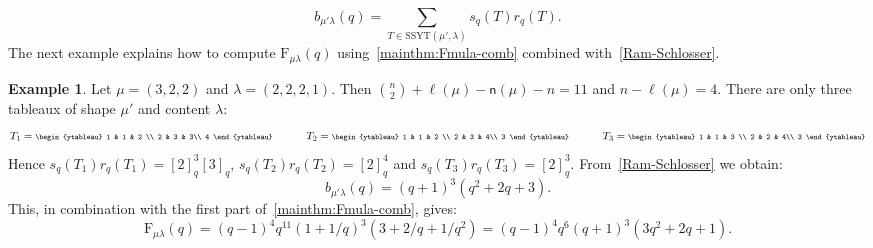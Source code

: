 \documentclass[12pt,a4paper,reqno]{amsart}
\theoremstyle{plain}
\theoremstyle{definition}
\newtheorem{example}[theorem]{Example}
\newcommand{\1}{\mathds{1}}
\newcommand{\F}{\mathrm{F}}
\newcommand{\fn}{\mathsf{n}}
\begin{document}
\begin{equation}\label{Ram-Schlosser} 
b_{\mu'\lambda}(q)=\sum_{T\in \mathrm{SSYT}(\mu',\lambda)}s_q(T)r_q(T). 
\end{equation}
The next example explains how to compute $\F_{\mu\lambda}(q)$ using~\cref{mainthm:Fmula-comb} combined with~\cref{Ram-Schlosser}.
\begin{example}\label{Example:bmu} Let $\mu=(3,2,2)$ and $\lambda=(2,2,2,1)$. Then $\binom{n}{2}+\ell(\mu)-\fn(\mu)-n=11$ and $n-\ell(\mu)=4$. There are only three tableaux of shape $\mu'$ and content $\lambda$:
  \begin{align*}
  \scriptsize
T_1=\begin{ytableau}
 1 & 1 & 2 \\
 2 & 3 & 3\\
 4
\end{ytableau}\qquad\qquad 
T_2=\begin{ytableau}
 1 & 1 & 2 \\
 2 & 3 & 4\\
 3
\end{ytableau}\qquad\qquad
T_3=\begin{ytableau}
 1 & 1 & 3 \\
 2 & 2 & 4\\
 3
\end{ytableau}
  \end{align*}
Hence
$s_q(T_1)r_q(T_1)= [2]_q^3[3]_q$, $s_q(T_2)r_q(T_2)=[2]_q^4$ and 
$s_q(T_3)r_q(T_3)=[2]_q^3$. From~\cref{Ram-Schlosser} we obtain: 
$$
b_{\mu'\lambda}(q)=(q+1)^3(q^2+2q+3).
$$
This, in combination with the first part of~\cref{mainthm:Fmula-comb}, gives:
\begin{equation*}
\F_{\mu\lambda}(q)=(q-1)^4q^{11}\left(1+1/q\right)^3\left(3+2/q+1/q^2\right)=(q-1)^4q^{6}(q+1)^3(3q^2 + 2q + 1).
\end{equation*}
\end{example}
\end{document}
